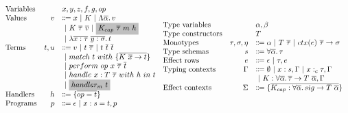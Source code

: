 \documentclass[acmsmall,review,screen]{acmart}
\newcommand{\graybox}[1]{\colorbox{lightgray}{$\displaystyle #1$}}
\newcommand{\vor}{~|~}
\newcommand{\ap}{~}
\newcommand{\ctx}[1]{ctx(#1)~}
\begin{document}
\begin{figure}
    \centering
    \begin{gather*}
        \begin{array}{lrll}
            \text{Variables} & & x, y, z, f, g, op \\
            \text{Values} &v &\Coloneqq x \vor K \vor \Lambda \overline{\alpha} \ldotp v \\
            &&\vor K\ap \overline{\tau} \ap \overline{v} \vor \graybox{K_{cap}\ap\overline{\tau}\ap m\ap h} \\
            &&\vor \lambda \overline{x : \tau}~\overline{y : \sigma}\ldotp t
            \\
            \text{Terms} &t, u &\Coloneqq v \vor t\ap\overline{\tau} \vor t \ap \overline{t} \ap \overline{t} \\
            &&\vor match ~ t ~ with ~\{\overline{K \ap \overline{x} \to t}\} \\
            &&\vor perform ~ op \ap x \ap \overline{\tau} \ap \overline{t} \\
            &&\vor handle ~ x : T \ap \overline{\tau} ~with ~h~in ~t \\
            &&\vor \graybox{handler_m ~ t}
            \\
            \text{Handlers} &h &\Coloneqq \{ \overline{op = t} \}
            \\
            \text{Programs} &p &\Coloneqq \epsilon \vor x : s = t, p
        \end{array}
        \begin{array}{lrl}
            \text{Type variables} && \alpha, \beta \\
            \text{Type constructors} && T \\
            \text{Monotypes} & \tau, \sigma, \eta &\Coloneqq \alpha \vor T \ap \overline{\tau} \vor \ctx{e} \overline{\tau} \to \sigma \\
            \text{Type schemas} & s &\Coloneqq \forall\overline{\alpha}\ldotp \tau \\
            \text{Effect rows} & e &\Coloneqq \epsilon\vor \tau, e \\
            \text{Typing contexts} & \Gamma &\Coloneqq \emptyset \vor x : s, \Gamma \vor x :_c \tau, \Gamma \\
            &&\vor K : \forall\overline{\alpha}\ldotp \overline{\tau}\to T\ap \overline{\alpha}, \Gamma \\
            \text{Effect contexts} & \Sigma &\Coloneqq \{\overline{K_{cap} : \forall\overline{\alpha}\ldotp sig\to T\ap\overline{\alpha}}\} \\

\end{array}
\end{gather*}
\end{figure}
\end{document}

